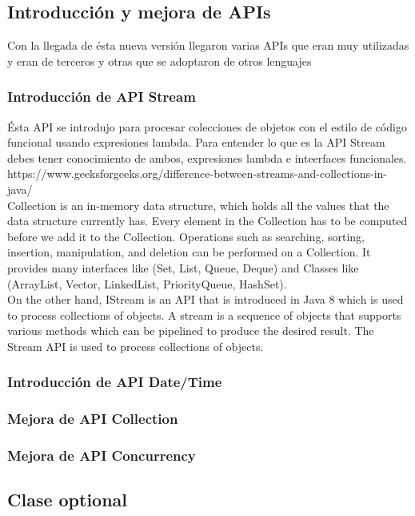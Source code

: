 \documentclass[12pt,article,oneside]{memoir}
\begin{document}
			\subsection{Introducci\'on y mejora de APIs}
			Con la llegada de \'esta nueva versi\'on llegaron varias APIs que eran muy utilizadas y eran de terceros y otras
			que se adoptaron de otros lenguajes
				\subsubsection{Introducci\'on de API Stream}
				\'Esta API se introdujo para procesar colecciones de objetos con el estilo de c\'odigo funcional usando 
				expresiones lambda. Para entender lo  que es la API Stream debes tener conocimiento de ambos, expresiones 
				lambda e inteerfaces funcionales.\\
				
					https://www.geeksforgeeks.org/difference-between-streams-and-collections-in-java/\\
				
				Collection is an in-memory data structure, which holds all the values that the data structure currently has. Every element in the Collection has to be computed before we add it to the Collection. Operations such as searching, sorting, insertion, manipulation, and deletion can be performed on a Collection. It provides many interfaces like (Set, List, Queue, Deque) and Classes like (ArrayList, Vector, LinkedList, PriorityQueue, HashSet).\\
				
				On the other hand, IStream is an API that is introduced in Java 8 which is used to process collections of objects. A stream is a sequence of objects that supports various methods which can be pipelined to produce the desired result. The Stream API is used to process collections of objects.
				\subsubsection{Introducci\'on de API Date/Time}
				\subsubsection{Mejora de API Collection}
				\subsubsection{Mejora de API Concurrency}
				
			\subsection{Clase optional}
			
\end{document}
